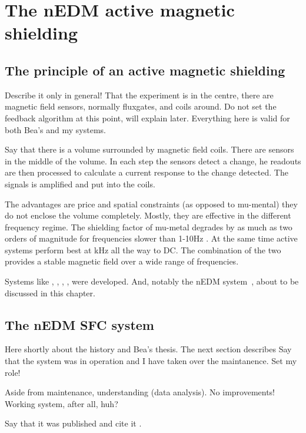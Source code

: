 \chapter{The nEDM active magnetic shielding}

\label{ch:nedm_sfc}


\section{The principle of an active magnetic shielding}
Describe it only in general! That the experiment is in the centre, there are magnetic field sensors, normally fluxgates, and coils around. Do not set the feedback algorithm at this point, will explain later. Everything here is valid for both Bea's and my systems.

Say that there is a volume surrounded by magnetic field coils. There are sensors in the middle of the volume. In each step the sensors detect a change, he readouts are then processed to calculate a current response to the change detected. The signals is amplified and put into the coils.

The advantages are price and spatial constraints (as opposed to mu-mental) they do not enclose the volume completely. Mostly, they are effective in the different frequency regime. The shielding factor of mu-metal degrades by as much as two orders of magnitude for frequencies slower than 1-10Hz \cite{Brake1991}. At the same time active systems perform best at kHz all the way to DC. The combination of the two provides a stable magnetic field over a wide range of frequencies.

Systems like \cite{Kobayashi2012}, \cite{Spemann2003}, \cite{RetaHernandez1998}, \cite{Voigt2013}, \cite{Brake1991} were developed. And, notably the nEDM system~\cite{Afach2014}, about to be discussed in this chapter.


\section{The nEDM SFC system}
Here shortly about the history and Bea's thesis. The next section describes Say that the system was in operation and I have taken over the maintanence. Set my role!

Aside from maintenance, understanding (data analysis). No improvements! Working system, after all, huh?

Say that it was published and cite it \cite{Afach2014}.




